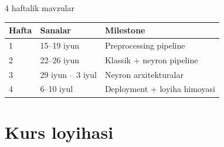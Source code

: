 \documentclass[aspectratio=169,11pt]{beamer}
\begin{document}
\begin{frame}{4 haftalik mavzular}
  \vspace{0.3em}
  \footnotesize
  \begin{tabular}{lll}
    \toprule
    \textbf{Hafta} & \textbf{Sanalar} & \textbf{Milestone} \\
    \midrule
    1 & 15--19 iyun & Preprocessing pipeline \\
    2 & 22--26 iyun & Klassik + neyron pipeline \\
    3 & 29 iyun -- 3 iyul & Neyron arxitekturalar \\
    4 & 6--10 iyul & Deployment + loyiha himoyasi\\
    \bottomrule
  \end{tabular}
\end{frame}

\section[Kurs loyihasi]{Kurs loyihasi}
\end{document}
